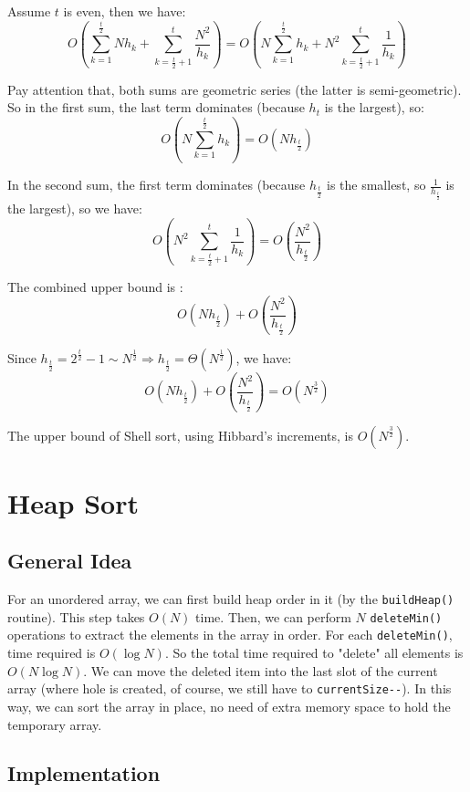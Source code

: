 \documentclass[12pt]{book}
\begin{document}
Assume \(t\) is even, then we have:
\[
O(\sum_{k = 1}^{\frac {t} {2}}Nh_k + \sum_{k = \frac {t} {2} + 1}^{t}\frac {N^2} {h_k}) = O(N\sum_{k = 1}^{\frac {t} {2}}h_k + N^2\sum_{k = \frac {t} {2} + 1}^{t}\frac {1} {h_k})
\]

Pay attention that, both sums are geometric series (the latter is semi-geometric). So in the first sum, the last term dominates (because \(h_t\) is the largest), so:
\[
O(N\sum_{k = 1}^{\frac {t} {2}}h_k) = O(Nh_{\frac {t} {2}})
\]

In the second sum, the first term dominates (because \(h_{\frac {t} {2}}\) is the smallest, so \(\frac {1} {h_{\frac {t} {2}}}\) is the largest), so we have:
\[
O(N^2\sum_{k = \frac {t} {2} + 1}^{t}\frac {1} {h_k}) = O(\frac {N^2} {h_{\frac {t} {2}}})
\]

The combined upper bound is :
\[
O(Nh_{\frac {t} {2}}) + O(\frac {N^2} {h_{\frac {t} {2}}})
\]

Since \(h_{\frac {t} {2}} = 2^{\frac {t} {2}} - 1 \sim N^{\frac {1} {2}} \Rightarrow h_{\frac {t} {2}} = \Theta (N^{\frac {1} {2}})\), we have:
\[
O(Nh_{\frac {t} {2}}) + O(\frac {N^2} {h_{\frac {t} {2}}}) = O(N^{\frac {3} {2}})
\]

The upper bound of Shell sort, using Hibbard's increments, is \(O(N^{\frac {3} {2}})\).

\chapter{Heap Sort}
\label{sec:orgfdee523}
\section{General Idea}
\label{sec:orge4a6fa3}
For an unordered array, we can first build heap order in it (by the \texttt{buildHeap()} routine). This step takes \(O(N)\) time. Then, we can perform \(N\) \texttt{deleteMin()} operations to extract the elements in the array in order. For each \texttt{deleteMin()}, time required is \(O(\log{N})\). So the total time required to "delete" all elements is \(O(N\log{N})\). We can move the deleted item into the last slot of the current array (where hole is created, of course, we still have to \texttt{currentSize-{}-}). In this way, we can sort the array in place, no need of extra memory space to hold the temporary array.
\section{Implementation}
\label{sec:org78c3670}
\end{document}
